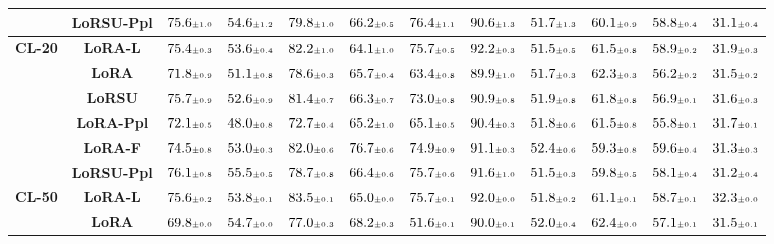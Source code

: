\begin{table}
\begin{center}
\begin{small}
\begin{tabular}{l c c c c c c c c c c c}
& \textbf{LoRSU-Ppl} & $75.6 \mtiny{\pm 1.0}$ & $54.6 \mtiny{\pm 1.2}$ & $79.8 \mtiny{\pm 1.0}$ & $66.2 \mtiny{\pm 0.5}$ & $76.4 \mtiny{\pm 1.1}$ & $90.6 \mtiny{\pm 1.3}$ & $51.7 \mtiny{\pm 1.3}$ & $60.1 \mtiny{\pm 0.9}$ & $58.8 \mtiny{\pm 0.4}$ & $31.1 \mtiny{\pm 0.4}$ \\
\midrule
\multirow{6}{*}{\textbf{CL-20}} & \textbf{LoRA-L} & $75.4 \mtiny{\pm 0.3}$ & $53.6 \mtiny{\pm 0.4}$ & $82.2 \mtiny{\pm 1.0}$ & $64.1 \mtiny{\pm 1.0}$ & $75.7 \mtiny{\pm 0.5}$ & $92.2 \mtiny{\pm 0.3}$ & $51.5 \mtiny{\pm 0.5}$ & $61.5 \mtiny{\pm 0.8}$ & $58.9 \mtiny{\pm 0.2}$ & $31.9 \mtiny{\pm 0.3}$ \\
& \textbf{LoRA} & $71.8 \mtiny{\pm 0.9}$ & $51.1 \mtiny{\pm 0.8}$ & $78.6 \mtiny{\pm 0.3}$ & $65.7 \mtiny{\pm 0.4}$ & $63.4 \mtiny{\pm 0.8}$ & $89.9 \mtiny{\pm 1.0}$ & $51.7 \mtiny{\pm 0.3}$ & $62.3 \mtiny{\pm 0.3}$ & $56.2 \mtiny{\pm 0.2}$ & $31.5 \mtiny{\pm 0.2}$ \\
& \textbf{LoRSU} & $75.7 \mtiny{\pm 0.9}$ & $52.6 \mtiny{\pm 0.9}$ & $81.4 \mtiny{\pm 0.7}$ & $66.3 \mtiny{\pm 0.7}$ & $73.0 \mtiny{\pm 0.8}$ & $90.9 \mtiny{\pm 0.8}$ & $51.9 \mtiny{\pm 0.8}$ & $61.8 \mtiny{\pm 0.8}$ & $56.9 \mtiny{\pm 0.1}$ & $31.6 \mtiny{\pm 0.3}$ \\
& \textbf{LoRA-Ppl} & $72.1 \mtiny{\pm 0.5}$ & $48.0 \mtiny{\pm 0.8}$ & $72.7 \mtiny{\pm 0.4}$ & $65.2 \mtiny{\pm 1.0}$ & $65.1 \mtiny{\pm 0.5}$ & $90.4 \mtiny{\pm 0.3}$ & $51.8 \mtiny{\pm 0.6}$ & $61.5 \mtiny{\pm 0.8}$ & $55.8 \mtiny{\pm 0.1}$ & $31.7 \mtiny{\pm 0.1}$ \\
& \textbf{LoRA-F} & $74.5 \mtiny{\pm 0.8}$ & $53.0 \mtiny{\pm 0.3}$ & $82.0 \mtiny{\pm 0.6}$ & $76.7 \mtiny{\pm 0.6}$ & $74.9 \mtiny{\pm 0.9}$ & $91.1 \mtiny{\pm 0.3}$ & $52.4 \mtiny{\pm 0.6}$ & $59.3 \mtiny{\pm 0.8}$ & $59.6 \mtiny{\pm 0.4}$ & $31.3 \mtiny{\pm 0.3}$ \\
& \textbf{LoRSU-Ppl} & $76.1 \mtiny{\pm 0.8}$ & $55.5 \mtiny{\pm 0.5}$ & $78.7 \mtiny{\pm 0.8}$ & $66.4 \mtiny{\pm 0.6}$ & $75.7 \mtiny{\pm 0.6}$ & $91.6 \mtiny{\pm 1.0}$ & $51.5 \mtiny{\pm 0.3}$ & $59.8 \mtiny{\pm 0.5}$ & $58.1 \mtiny{\pm 0.4}$ & $31.2 \mtiny{\pm 0.4}$ \\
\midrule
\multirow{6}{*}{\textbf{CL-50}} & \textbf{LoRA-L} & $75.6 \mtiny{\pm 0.2}$ & $53.8 \mtiny{\pm 0.1}$ & $83.5 \mtiny{\pm 0.1}$ & $65.0 \mtiny{\pm 0.0}$ & $75.7 \mtiny{\pm 0.1}$ & $92.0 \mtiny{\pm 0.0}$ & $51.8 \mtiny{\pm 0.2}$ & $61.1 \mtiny{\pm 0.1}$ & $58.7 \mtiny{\pm 0.1}$ & $32.3 \mtiny{\pm 0.0}$ \\
& \textbf{LoRA} & $69.8 \mtiny{\pm 0.0}$ & $54.7 \mtiny{\pm 0.0}$ & $77.0 \mtiny{\pm 0.3}$ & $68.2 \mtiny{\pm 0.3}$ & $51.6 \mtiny{\pm 0.1}$ & $90.0 \mtiny{\pm 0.1}$ & $52.0 \mtiny{\pm 0.4}$ & $62.4 \mtiny{\pm 0.0}$ & $57.1 \mtiny{\pm 0.1}$ & $31.5 \mtiny{\pm 0.1}$ \\

\end{tabular}
\end{small}
\end{center}
\end{table}
